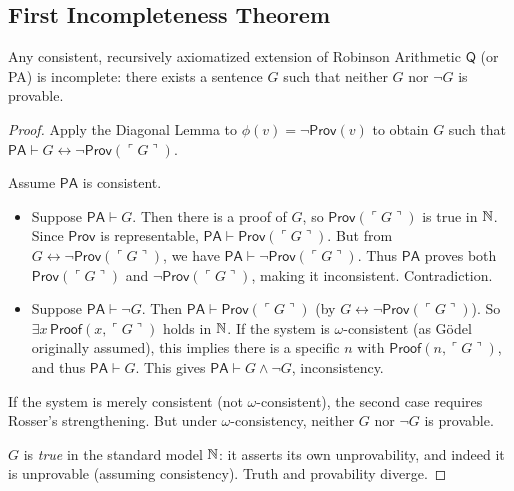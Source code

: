 \subsection{First Incompleteness Theorem}
\label{sec:godel:first}

\begin{theorem}
Any consistent, recursively axiomatized extension of Robinson Arithmetic $\mathsf{Q}$ (or PA) is incomplete: there exists a sentence $G$ such that neither $G$ nor $\neg G$ is provable.
\end{theorem}

\begin{proof}
Apply the Diagonal Lemma to $\phi(v) = \neg \mathsf{Prov}(v)$ to obtain $G$ such that $\mathsf{PA} \vdash G \leftrightarrow \neg \mathsf{Prov}(\ulcorner G \urcorner)$.

Assume $\mathsf{PA}$ is consistent.

\begin{itemize}
\item Suppose $\mathsf{PA} \vdash G$. Then there is a proof of $G$, so $\mathsf{Prov}(\ulcorner G \urcorner)$ is true in $\mathbb{N}$. Since $\mathsf{Prov}$ is representable, $\mathsf{PA} \vdash \mathsf{Prov}(\ulcorner G \urcorner)$. But from $G \leftrightarrow \neg \mathsf{Prov}(\ulcorner G \urcorner)$, we have $\mathsf{PA} \vdash \neg \mathsf{Prov}(\ulcorner G \urcorner)$. Thus $\mathsf{PA}$ proves both $\mathsf{Prov}(\ulcorner G \urcorner)$ and $\neg \mathsf{Prov}(\ulcorner G \urcorner)$, making it inconsistent. Contradiction.

\item Suppose $\mathsf{PA} \vdash \neg G$. Then $\mathsf{PA} \vdash \mathsf{Prov}(\ulcorner G \urcorner)$ (by $G \leftrightarrow \neg \mathsf{Prov}(\ulcorner G \urcorner)$). So $\exists x\, \mathsf{Proof}(x, \ulcorner G \urcorner)$ holds in $\mathbb{N}$. If the system is $\omega$-consistent (as Gödel originally assumed), this implies there is a specific $n$ with $\mathsf{Proof}(n, \ulcorner G \urcorner)$, and thus $\mathsf{PA} \vdash G$. This gives $\mathsf{PA} \vdash G \land \neg G$, inconsistency.
\end{itemize}

If the system is merely consistent (not $\omega$-consistent), the second case requires Rosser's strengthening. But under $\omega$-consistency, neither $G$ nor $\neg G$ is provable.

$G$ is \emph{true} in the standard model $\mathbb{N}$: it asserts its own unprovability, and indeed it is unprovable (assuming consistency). Truth and provability diverge.
\end{proof}

